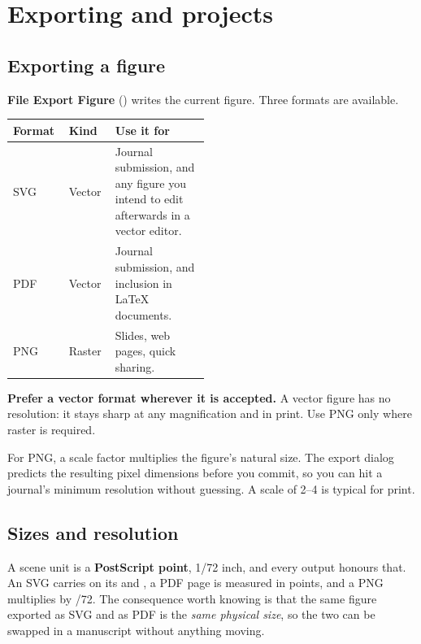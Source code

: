 \chapter{Exporting and projects}
\label{ch:export}

\section{Exporting a figure}

\textbf{File \textbf{\textrightarrow} Export Figure} () writes the
current figure. Three formats are available.

\begin{center}
\begin{tabular}{@{}llp{0.48\linewidth}@{}}
\toprule
\textbf{Format} & \textbf{Kind} & \textbf{Use it for} \\
\midrule
SVG & Vector & Journal submission, and any figure you intend to edit afterwards in a vector editor. \\
PDF & Vector & Journal submission, and inclusion in \LaTeX{} documents. \\
PNG & Raster & Slides, web pages, quick sharing. \\
\bottomrule
\end{tabular}
\end{center}

\textbf{Prefer a vector format wherever it is accepted.} A vector figure has no
resolution: it stays sharp at any magnification and in print. Use PNG only where
raster is required.

For PNG, a scale factor multiplies the figure's natural size. The export dialog
predicts the resulting pixel dimensions before you commit, so you can hit a
journal's minimum resolution without guessing. A scale of 2--4 is typical for
print.

\section{Sizes and resolution}

A scene unit is a \textbf{PostScript point}, 1/72 inch, and every output honours
that. An SVG carries  on its  and , a PDF page is
measured in points, and a PNG multiplies by /72. The consequence worth
knowing is that the same figure exported as SVG and as PDF is the \emph{same
physical size}, so the two can be swapped in a manuscript without anything
moving.

